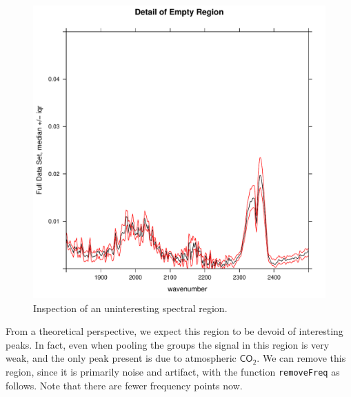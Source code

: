 \documentclass[letter,10pt,twocolumn,twoside,printwatermark=false]{pinp}
\begin{document}
\begin{Shaded}
\begin{Highlighting}[]
   \NormalTok{,}
   \NormalTok{,}
   \NormalTok{,}
   \NormalTok{(}\NormalTok{, }\NormalTok{),}
   \NormalTok{(}\NormalTok{, }\NormalTok{))}
\end{Highlighting}
\end{Shaded}

\begin{figure}

{\centering \includegraphics[width=\linewidth,height=\linewidth]{ChemoSpec2_files/figure-latex/Chunk14c-1} 

}

\caption{\label{survC}Inspection of an uninteresting spectral region.}\label{fig:Chunk14c}
\end{figure}

From a theoretical perspective, we expect this region to be devoid of
interesting peaks. In fact, even when pooling the groups the signal in
this region is very weak, and the only peak present is due to
atmospheric \(\mathsf{CO_2}\). We can remove this region, since it is
primarily noise and artifact, with the function \texttt{removeFreq} as
follows. Note that there are fewer frequency points now.
\end{document}
